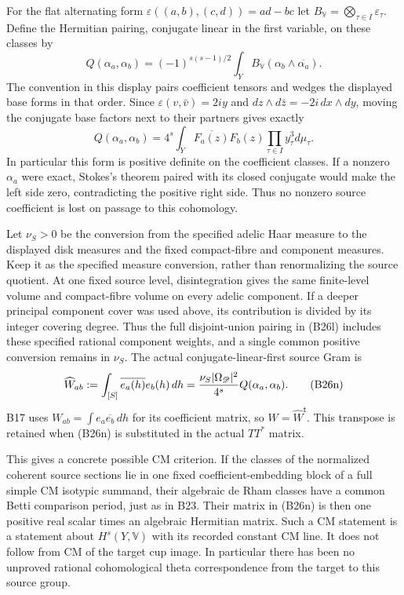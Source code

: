 For the flat alternating form
$\varepsilon((a,b),(c,d))=ad-bc$ let
$B_{\mathbb V}=\bigotimes_{\tau\in I}\varepsilon_\tau$.
Define the Hermitian pairing, conjugate linear in the first
variable, on these classes by
\[
 Q(\alpha_a,\alpha_b)=
  (-1)^{s(s-1)/2}
     \int_Y B_{\mathbb V}(\alpha_b\wedge\overline{\alpha_a}).
 \tag{B26l}
\]
The convention in this display pairs coefficient tensors and
wedges the displayed base forms in that order.  Since
$\varepsilon(v,\bar v)=2iy$ and
$dz\wedge d\bar z=-2i\,dx\wedge dy$, moving the conjugate
base factors next to their partners gives exactly
\[
 Q(\alpha_a,\alpha_b)=
       4^s\int_Y\overline{F_a(z)}F_b(z)
                     \prod_{\tau\in I}y_\tau^3d\mu_\tau.
 \tag{B26m}
\]
In particular this form is positive definite on the
coefficient classes.  If a nonzero $\alpha_a$ were exact,
Stokes's theorem paired with its closed conjugate would make
the left side zero, contradicting the positive right side.
Thus no nonzero source coefficient is lost on passage to
this cohomology.

Let $\nu_S>0$ be the conversion from the specified adelic
Haar measure to the displayed disk measures and the fixed
compact-fibre and component measures.  Keep it as the
specified measure conversion, rather than renormalizing the
source quotient.  At one fixed source level, disintegration
gives the same finite-level volume and compact-fibre volume
on every adelic component.  If a deeper principal component
cover was used above, its contribution is divided by its
integer covering degree.  Thus the full disjoint-union
pairing in (B26l) includes these specified rational component
weights, and a single common positive conversion remains
in $\nu_S$.  The actual
conjugate-linear-first source Gram is
\[
 \widehat W_{ab}:=\int_{[S]}\overline{e_a(h)}e_b(h)\,dh
      ={\nu_S|\Omega_{\mathscr D}|^2\over4^s}
                                      Q(\alpha_a,\alpha_b).
 \tag{B26n}
\]
B17 uses $W_{ab}=\int e_a\overline{e_b}\,dh$ for its
coefficient matrix, so $W=\widehat W^{\mathsf t}$.
This transpose is retained when (B26n) is substituted in
the actual $TT^*$ matrix.

This gives a concrete possible CM criterion.  If the classes
of the normalized coherent source sections lie in one fixed
coefficient-embedding block of a full simple CM isotypic
summand, their algebraic de Rham classes
have a common Betti comparison period, just as in B23.
Their matrix in (B26n) is then one positive real scalar
times an algebraic Hermitian matrix.  Such a CM statement
is a statement about $H^s(Y,\mathbb V)$ with its recorded
constant CM line.  It does not follow from CM of the target
cup image.  In particular there has been no unproved
rational cohomological theta correspondence from the target
to this source group.

